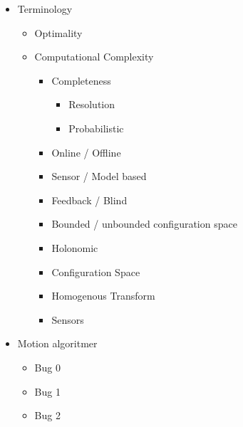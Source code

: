 \documentclass[a4paper,11pt]{article}
\begin{document}
    \begin{itemize}
        \item Terminology
            \begin{itemize}
                \item Optimality
                \item Computational Complexity
                    \begin{itemize}
                        \item Completeness
                            \begin{itemize}
                                \item Resolution
                                \item Probabilistic
                            \end{itemize}
                        \item Online / Offline
                        \item Sensor / Model based
                        \item Feedback / Blind
                        \item Bounded / unbounded configuration space
                        \item Holonomic
                        \item Configuration Space
                        \item Homogenous Transform
                        \item Sensors
                    \end{itemize}
            \end{itemize}
    \end{itemize}
    \begin{itemize}
        \item Motion algoritmer
            \begin{itemize}
                \item Bug 0
                \item Bug 1
                \item Bug 2
            \end{itemize}
    \end{itemize}
\end{document}
